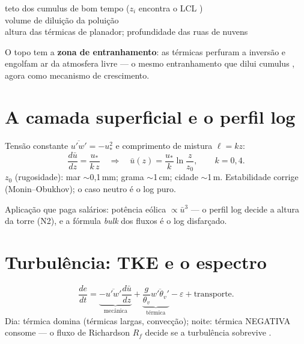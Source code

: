 \documentclass[11pt]{article}
\begin{document}
\begin{noquadro}
teto dos cumulus de bom tempo ($z_i$ encontra o LCL
)\\
volume de diluição da poluição \\
altura das térmicas de planador; profundidade das ruas de nuvens
\end{noquadro}

O topo tem a \textbf{zona de entranhamento}: as térmicas perfuram a
inversão e engolfam ar da atmosfera livre — o mesmo entranhamento que
dilui cumulus , agora como mecanismo de
crescimento.

\section{A camada superficial e o perfil log}\label{sec:sup}


\begin{formadif}
Tensão constante $\overline{u'w'} = -u_*^2$ e comprimento de mistura
$\ell = kz$:
\[ \frac{d\bar u}{dz} = \frac{u_*}{k\,z}
\quad\Rightarrow\quad
\bar u(z) = \frac{u_*}{k}\ln\frac{z}{z_0},\qquad k = 0{,}4. \]
$z_0$ (rugosidade): mar $\sim$0{,}1\,mm; grama $\sim$1\,cm; cidade
$\sim$1\,m. Estabilidade corrige (Monin--Obukhov); o caso neutro é o
log puro.
\end{formadif}

Aplicação que paga salários: potência eólica $\propto \bar u^3$ — o
perfil log decide a altura da torre (N2), e a fórmula \emph{bulk} dos
fluxos  é o log disfarçado.

\section{Turbulência: TKE e o espectro}\label{sec:turb}

\begin{formadif}
\[ \frac{de}{dt} =
\underbrace{-\overline{u'w'}\frac{d\bar u}{dz}}_{\text{mecânica}}
+ \underbrace{\frac{g}{\theta_v}\overline{w'\theta_v'}}_{\text{térmica}}
- \varepsilon + \text{transporte}. \]
Dia: térmica domina (térmicas largas, convecção); noite: térmica
NEGATIVA consome — o fluxo de Richardson $R_f$ decide se a turbulência
sobrevive .
\end{formadif}
\end{document}
